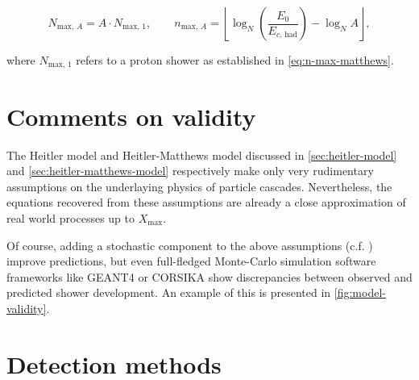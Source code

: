 \begin{equation}
N_{\text{max},\,A} = A \cdot N_{\text{max},\,1}, \qquad n_{\text{max},\,A} = \left\lfloor \log_N\left(\frac{E_0}{E_{c,\,\text{had}}}\right) - \log_N A \right\rfloor,
\end{equation}

where $N_{\text{max},\,1}$ refers to a proton shower as established in \autoref{eq:n-max-matthews}.

\section{Comments on validity}
\label{sec:cr-shower-validity}

The Heitler model and Heitler-Matthews model discussed in \autoref{sec:heitler-model} and \autoref{sec:heitler-matthews-model} respectively make only very 
rudimentary assumptions on the underlaying physics of particle cascades. Nevertheless, the equations recovered from these assumptions are already a close 
approximation of real world processes up to $X_\text{max}$. 

Of course, adding a stochastic component to the above assumptions (c.f. \cite{MartinShowerSim}) improve predictions, but even full-fledged Monte-Carlo simulation 
software frameworks like GEANT4 \cite{agostinelli2003geant4} or CORSIKA \cite{heck1998corsika} show discrepancies between observed and predicted shower 
development. An example of this is presented in \autoref{fig:model-validity}.



\section{Detection methods}
\label{sec:detecion-methods}
